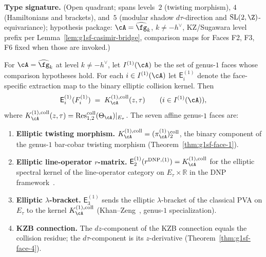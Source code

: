\begin{theorem}
\label{thm:g1sf-master}
\textbf{Type signature.} (Open quadrant; spans levels~$2$
\textup{(}twisting morphism\textup{)}, $4$ \textup{(}Hamiltonians and
brackets\textup{)}, and~$5$ \textup{(}modular shadow $d\tau$-direction
and $\mathrm{SL}(2,\Z)$-equivariance\textup{)}; hypothesis package:
$\cA=\widehat{\fg}_k$, $k\neq -h^\vee$, KZ/Sugawara level prefix per
Lemma~\ref{lem:g1sf-casimir-bridge}, comparison maps for Faces F2, F3,
F6 fixed when those are invoked.)

For $\cA = \widehat{\fg}_k$ at level $k \neq -h^\vee$, let
$I^{(1)}(\cA)$ be the set of genus-$1$ faces whose comparison
hypotheses hold. For each $i\in I^{(1)}(\cA)$ let
$\mathsf E_i^{(1)}$ denote the face-specific extraction map to the
binary elliptic collision kernel. Then
\[
\mathsf E_i^{(1)}(F_i^{(1)})
\;=\;
K_\cA^{(1),\mathrm{coll}}(z,\tau)
\qquad (i\in I^{(1)}(\cA)),
\]
where
$K_\cA^{(1),\mathrm{coll}}(z,\tau)=
\operatorname{Res}^{\mathrm{coll}}_{1,2}(\Theta_\cA)|_{E_\tau}$.
The seven affine genus-$1$ faces are:
\begin{enumerate}[label=\textup{(F\arabic*${}^{(1)}$)}]
\item \textbf{Elliptic twisting morphism.}
$K_\cA^{(1),\mathrm{coll}}=(\pi_\cA^{(1)})_2^{\mathrm{coll}}$, the binary component of the genus-$1$ bar-cobar twisting
morphism \textup{(}Theorem~\textup{\ref{thm:g1sf-face-1})}.

\item \textbf{Elliptic line-operator $r$-matrix.}
$\mathsf E_2^{(1)}(r^{\mathrm{DNP},(1)})=K_\cA^{(1),\mathrm{coll}}$ for the
elliptic spectral kernel of the line-operator category on
$E_\tau \times \mathbb{R}$ in the DNP framework~\cite{DNP25}.

\item \textbf{Elliptic $\lambda$-bracket.}
$\mathsf E_3^{(1)}$ sends the elliptic $\lambda$-bracket of the
classical PVA on $E_\tau$ to the kernel $K_\cA^{(1),\mathrm{coll}}$
\textup{(}Khan--Zeng~\cite{KhanZeng25}, genus-$1$ specialization\textup{)}.

\item \textbf{KZB connection.}
The $dz$-component of the KZB connection equals the collision residue;
the $d\tau$-component is its $z$-derivative
\textup{(}Theorem~\textup{\ref{thm:g1sf-face-4})}.


\end{enumerate}
\end{theorem}
